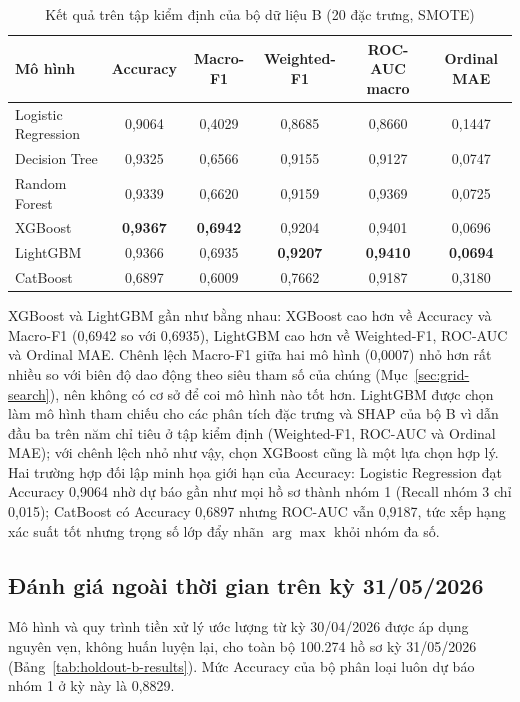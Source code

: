 \begin{table}[H]
\centering
\caption{Kết quả trên tập kiểm định của bộ dữ liệu B (20 đặc trưng, SMOTE)}
\label{tab:verified-model-results}
\begin{tabular}{|l|c|c|c|c|c|}
\hline
Mô hình & Accuracy & Macro-F1 & Weighted-F1 & ROC-AUC macro & Ordinal MAE\\
\hline
Logistic Regression & 0,9064 & 0,4029 & 0,8685 & 0,8660 & 0,1447\\
Decision Tree & 0,9325 & 0,6566 & 0,9155 & 0,9127 & 0,0747\\
Random Forest & 0,9339 & 0,6620 & 0,9159 & 0,9369 & 0,0725\\
XGBoost & \textbf{0,9367} & \textbf{0,6942} & 0,9204 & 0,9401 & 0,0696\\
LightGBM & 0,9366 & 0,6935 & \textbf{0,9207} & \textbf{0,9410} & \textbf{0,0694}\\
CatBoost & 0,6897 & 0,6009 & 0,7662 & 0,9187 & 0,3180\\
\hline
\end{tabular}
\end{table}

XGBoost và LightGBM gần như bằng nhau: XGBoost cao hơn về Accuracy và Macro-F1 (0,6942 so với 0,6935), LightGBM cao hơn về Weighted-F1, ROC-AUC và Ordinal MAE. Chênh lệch Macro-F1 giữa hai mô hình (0,0007) nhỏ hơn rất nhiều so với biên độ dao động theo siêu tham số của chúng (Mục~\ref{sec:grid-search}), nên không có cơ sở để coi mô hình nào tốt hơn. LightGBM được chọn làm mô hình tham chiếu cho các phân tích đặc trưng và SHAP của bộ B vì dẫn đầu ba trên năm chỉ tiêu ở tập kiểm định (Weighted-F1, ROC-AUC và Ordinal MAE); với chênh lệch nhỏ như vậy, chọn XGBoost cũng là một lựa chọn hợp lý. Hai trường hợp đối lập minh họa giới hạn của Accuracy: Logistic Regression đạt Accuracy 0,9064 nhờ dự báo gần như mọi hồ sơ thành nhóm 1 (Recall nhóm 3 chỉ 0,015); CatBoost có Accuracy 0,6897 nhưng ROC-AUC vẫn 0,9187, tức xếp hạng xác suất tốt nhưng trọng số lớp đẩy nhãn $\arg\max$ khỏi nhóm đa số.

\subsection{Đánh giá ngoài thời gian trên kỳ 31/05/2026}
\label{sec:holdout-b}

Mô hình và quy trình tiền xử lý ước lượng từ kỳ 30/04/2026 được áp dụng nguyên vẹn, không huấn luyện lại, cho toàn bộ 100.274 hồ sơ kỳ 31/05/2026 (Bảng~\ref{tab:holdout-b-results}). Mức Accuracy của bộ phân loại luôn dự báo nhóm 1 ở kỳ này là 0,8829.

